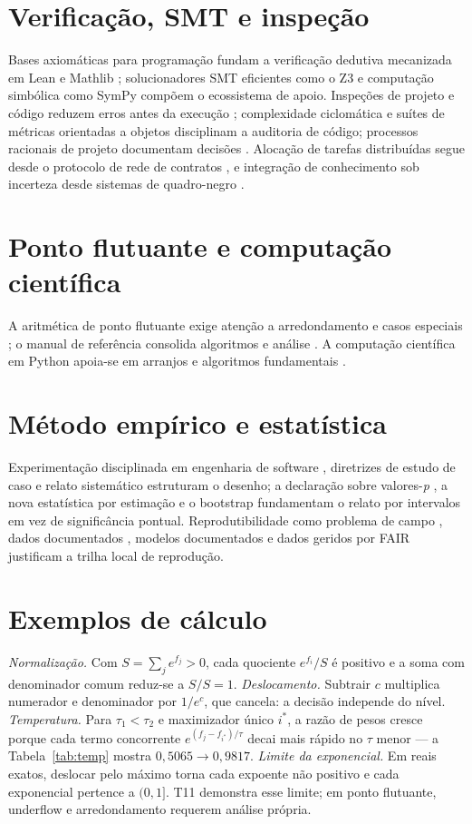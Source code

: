 \documentclass[12pt,openany,oneside,a4paper,brazil,chapter=TITLE]{abntex2}
\let\cite\citep
\begin{document}
\section{Verificação, SMT e inspeção}
Bases axiomáticas para programação \cite{hoare1969} fundam a verificação dedutiva mecanizada em Lean \cite{moura2021} e Mathlib \cite{mathlib2020}; solucionadores SMT eficientes como o Z3 \cite{demoura2008} e computação simbólica como SymPy \cite{meurer2017} compõem o ecossistema de apoio. Inspeções de projeto e código reduzem erros antes da execução \cite{fagan1976}; complexidade ciclomática \cite{mccabe1976} e suítes de métricas orientadas a objetos \cite{chidamber1994} disciplinam a auditoria de código; processos racionais de projeto documentam decisões \cite{parnas1986}. Alocação de tarefas distribuídas segue desde o protocolo de rede de contratos \cite{smith1980}, e integração de conhecimento sob incerteza desde sistemas de quadro-negro \cite{erman1980}.
\section{Ponto flutuante e computação científica}
A aritmética de ponto flutuante exige atenção a arredondamento e casos especiais \cite{goldberg1991}; o manual de referência consolida algoritmos e análise \cite{muller2018}. A computação científica em Python apoia-se em arranjos \cite{harris2020} e algoritmos fundamentais \cite{virtanen2020}.
\section{Método empírico e estatística}
Experimentação disciplinada em engenharia de software \cite{basili1986,wohlin2012}, diretrizes de estudo de caso \cite{runeson2009} e relato sistemático \cite{page2021} estruturam o desenho; a declaração sobre valores-\textit{p} \cite{wasserstein2016}, a nova estatística por estimação \cite{cumming2014} e o bootstrap \cite{efron1979} fundamentam o relato por intervalos em vez de significância pontual. Reprodutibilidade como problema de campo \cite{osc2015,collberg2016,ioannidis2005}, dados documentados \cite{gebru2021}, modelos documentados \cite{mitchell2019} e dados geridos por FAIR \cite{wilkinson2016} justificam a trilha local de reprodução.
\section{Exemplos de cálculo}
\textit{Normalização.} Com $S=\sum_j e^{f_j}>0$, cada quociente $e^{f_i}/S$ é positivo e a soma com denominador comum reduz-se a $S/S=1$. \textit{Deslocamento.} Subtrair $c$ multiplica numerador e denominador por $1/e^c$, que cancela: a decisão independe do nível. \textit{Temperatura.} Para $\tau_1<\tau_2$ e maximizador único $i^*$, a razão de pesos cresce porque cada termo concorrente $e^{(f_j-f_{i^*})/\tau}$ decai mais rápido no $\tau$ menor --- a Tabela~\ref{tab:temp} mostra $0{,}5065\to0{,}9817$. \textit{Limite da exponencial.} Em reais exatos, deslocar pelo máximo torna cada expoente não positivo e cada exponencial pertence a $(0,1]$. T11 demonstra esse limite; em ponto flutuante, underflow e arredondamento requerem análise própria.
\end{document}
